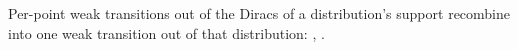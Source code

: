 \begin{lemma}
  \label{lem:mix}
  \leanok
  Per-point weak transitions out of the Diracs of a distribution's support recombine into one weak transition out of that distribution: , .
\end{lemma}
